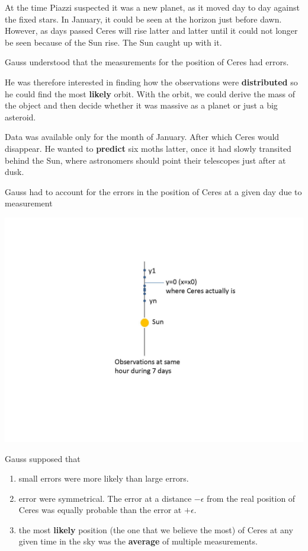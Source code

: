 \documentclass[
]{book}
\begin{document}
At the time Piazzi suspected it was a new planet, as it moved day to day against the fixed stars. In January, it could be seen at the horizon just before dawn. However, as days passed Ceres will rise latter and latter until it could not longer be seen because of the Sun rise. The Sun caught up with it.

Gauss understood that the measurements for the position of Ceres had errors.

He was therefore interested in finding how the observations were \textbf{distributed} so he could find the most \textbf{likely} orbit. With the orbit, we could derive the mass of the object and then decide whether it was massive as a planet or just a big asteroid.

Data was available only for the month of January. After which Ceres would disappear. He wanted to \textbf{predict} six moths latter, once it had slowly transited behind the Sun, where astronomers should point their telescopes just after at dusk.

Gauss had to account for the errors in the position of Ceres at a given day due to measurement

\includegraphics{./figures/ceres.JPG}

Gauss supposed that

\begin{enumerate}
\def\labelenumi{\arabic{enumi})}
\item
  small errors were more likely than large errors.
\item
  error were symmetrical. The error at a distance \(-\epsilon\) from the real position of Ceres was equally probable than the error at \(+\epsilon\).
\item
  the most \textbf{likely} position (the one that we believe the most) of Ceres at any given time in the sky was the \textbf{average} of multiple measurements.
\end{enumerate}
\end{document}
